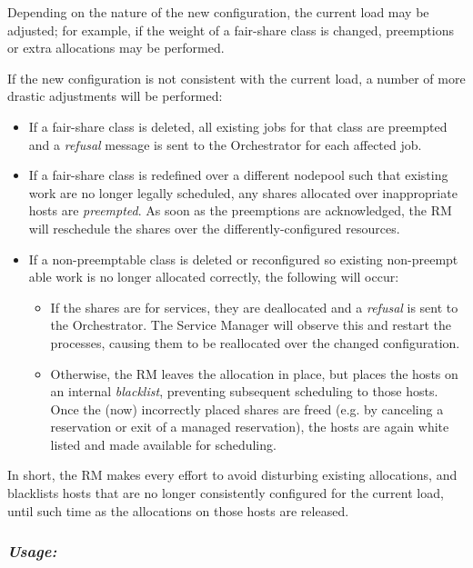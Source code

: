     Depending on the nature of the new configuration, the current load may be adjusted; for
    example, if the weight of a fair-share class is changed, preemptions or extra allocations
    may be performed.

    If the new configuration is not consistent with the current load, a number of more drastic
    adjustments will be performed:
    \begin{itemize}
      \item If a fair-share class is deleted, all existing jobs for that class are preempted
        and a {\em refusal} message is sent to the Orchestrator for each affected job.
      \item If a fair-share class is redefined over a different nodepool such that existing
        work are no longer legally scheduled, any shares allocated over inappropriate
        hosts are {\em preempted}.  As soon as the preemptions are acknowledged, the RM
        will reschedule the shares over the differently-configured resources.
      \item If a non-preemptable class is deleted or reconfigured so existing non-preempt able
        work is no longer allocated correctly, the following will occur:
        \begin{itemize}
            \item If the shares are for services, they are deallocated and a {\em refusal} is
              sent to the Orchestrator.  The Service Manager will observe this and restart the
              processes, causing them to be reallocated over the changed configuration.
            \item Otherwise, the RM leaves the allocation in place, but places the hosts on an
              internal {\em blacklist}, preventing subsequent scheduling to those hosts. Once
              the (now) incorrectly placed shares are freed (e.g. by canceling a reservation or
              exit of a managed reservation), the hosts are again white listed and made available
              for scheduling.
        \end{itemize}
     \end{itemize}
        
    In short, the RM makes every effort to avoid disturbing existing allocations, and blacklists
    hosts that are no longer consistently configured for the current load, until such time as
    the allocations on those hosts are released.

    \subsubsection{\em Usage:}

